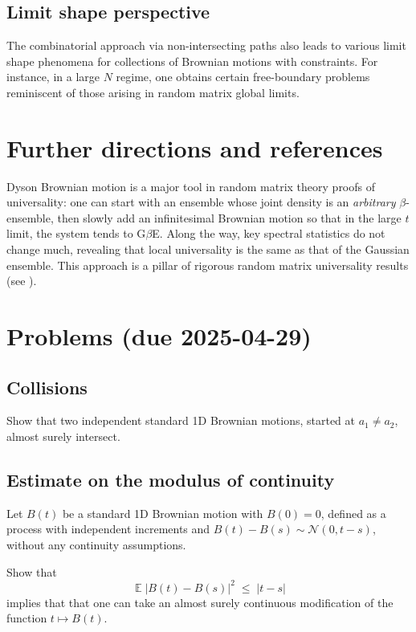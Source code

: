 \documentclass[letterpaper,11pt,oneside,reqno]{article}
\numberwithin{equation}{section}
\theoremstyle{definition}
\begin{document}
\subsection{Limit shape perspective}
The combinatorial approach via non-intersecting paths also leads to various limit shape phenomena for collections of Brownian motions with constraints. For instance, in a large $N$ regime, one obtains certain free-boundary problems reminiscent of those arising in random matrix global limits.

\section{Further directions and references}
Dyson Brownian motion is a major tool in random matrix theory proofs of universality: one can start with an ensemble whose joint density is an \emph{arbitrary} $\beta$-ensemble, then slowly add an infinitesimal Brownian motion so that in the large $t$ limit, the system tends to G$\beta$E. Along the way, key spectral statistics do not change much, revealing that local universality is the same as that of the Gaussian ensemble. This approach is a pillar of rigorous random matrix universality results (see \cite{ErdosYau2017Dynamical}).

\appendix
\setcounter{section}{9}
\section{Problems (due 2025-04-29)}

\subsection{Collisions}

Show that two independent standard 1D Brownian motions, started at $a_1\neq a_2$, almost surely intersect.

\subsection{Estimate on the modulus of continuity}

Let $B(t)$ be a standard 1D Brownian motion with $B(0)=0$,
defined as a process with independent increments and $B(t)-B(s)\sim \mathcal{N}(0,t-s)$,
without any continuity assumptions.

Show that
\begin{equation*}
	\operatorname{\mathbb{E}}|B(t)-B(s)|^2 \;\le\; |t-s|
\end{equation*}
implies that
that one can take an almost
surely continuous modification of the function $t\mapsto B(t)$.
\end{document}
